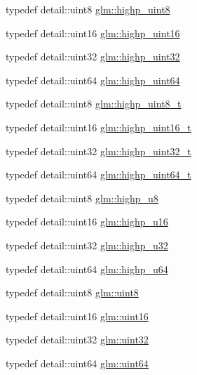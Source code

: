 \begin{DoxyCompactItemize}
typedef detail\-::uint8 \hyperlink{group__gtc__type__precision_ga2c27c6dd26e893786f04b10f99c1ee95}{glm\-::highp\-\_\-uint8}
\item 
typedef detail\-::uint16 \hyperlink{group__gtc__type__precision_ga4d32967d45ba8365e2a05eaaac85e978}{glm\-::highp\-\_\-uint16}
\item 
typedef detail\-::uint32 \hyperlink{group__gtc__type__precision_ga3145e44c73e2df7dfe4f3cb65974bf22}{glm\-::highp\-\_\-uint32}
\item 
typedef detail\-::uint64 \hyperlink{group__gtc__type__precision_ga8079c653e20cda03d34b99de629a7b09}{glm\-::highp\-\_\-uint64}
\item 
typedef detail\-::uint8 \hyperlink{group__gtc__type__precision_ga9ba529fcc75b82d23da979f0ce6e4518}{glm\-::highp\-\_\-uint8\-\_\-t}
\item 
typedef detail\-::uint16 \hyperlink{group__gtc__type__precision_ga3145bc0ee80432c165e985a188a722b3}{glm\-::highp\-\_\-uint16\-\_\-t}
\item 
typedef detail\-::uint32 \hyperlink{group__gtc__type__precision_ga8eb85ad460079c63b68866ae34637bda}{glm\-::highp\-\_\-uint32\-\_\-t}
\item 
typedef detail\-::uint64 \hyperlink{group__gtc__type__precision_ga6e66f40c5909bfc872b068187fa6029e}{glm\-::highp\-\_\-uint64\-\_\-t}
\item 
typedef detail\-::uint8 \hyperlink{group__gtc__type__precision_ga8a60abe782749c504fb5ae51eb8b49cc}{glm\-::highp\-\_\-u8}
\item 
typedef detail\-::uint16 \hyperlink{group__gtc__type__precision_ga9da2178d7501d9c0f225fa1a7b70cb45}{glm\-::highp\-\_\-u16}
\item 
typedef detail\-::uint32 \hyperlink{group__gtc__type__precision_gae8e8a2c712653891a03c171795286ac5}{glm\-::highp\-\_\-u32}
\item 
typedef detail\-::uint64 \hyperlink{group__gtc__type__precision_ga6006ea883d3c0491791650b2fb84de39}{glm\-::highp\-\_\-u64}
\item 
typedef detail\-::uint8 \hyperlink{group__gtc__type__precision_ga1a7dcd8aac97cc8020817c94049deff2}{glm\-::uint8}
\item 
typedef detail\-::uint16 \hyperlink{group__gtc__type__precision_gad8c2939e1fdd8e5828b31d95c52255d5}{glm\-::uint16}
\item 
typedef detail\-::uint32 \hyperlink{group__gtc__type__precision_ga202b6a53c105fcb7e531f9b443518451}{glm\-::uint32}
\item 
typedef detail\-::uint64 \hyperlink{group__gtc__type__precision_gae3632bf9b37da66233d78930dd06378a}{glm\-::uint64}

\end{DoxyCompactItemize}
